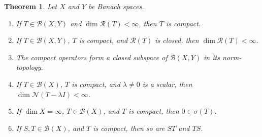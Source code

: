 \documentclass[12pt]{article}
\theoremstyle{thmstyle}
\newtheorem{theorem}{Theorem}[section]
\theoremstyle{defstyle}
\newcommand{\scrB}{\mathscr B}
\newcommand{\scrN}{\mathscr N}
\newcommand{\scrR}{\mathscr R}
\begin{document}
\begin{theorem}
    Let $X$ and $Y$ be Banach spaces. 
    \begin{enumerate}[label = (\alph*)]
        \item If $T\in\scrB(X, Y)$ and $\dim\scrR(T) < \infty$, then $T$ is compact.
        \item If $T\in\scrB(X, Y)$, $T$ is compact, and $\scrR(T)$ is closed, then $\dim\scrR(T) < \infty$.
        \item The compact operators form a closed subspace of $\scrB(X, Y)$ in its norm-topology. 
        \item If $T\in\scrB(X)$, $T$ is compact, and $\lambda\ne 0$ is a scalar, then $\dim\scrN(T - \lambda I) < \infty$.
        \item If $\dim X = \infty$, $T\in\scrB(X)$, and $T$ is compact, then $0\in\sigma(T)$.
        \item If $S, T\in\scrB(X)$, and $T$ is compact, then so are $ST$ and $TS$.
    \end{enumerate}
\end{theorem}
\end{document}
